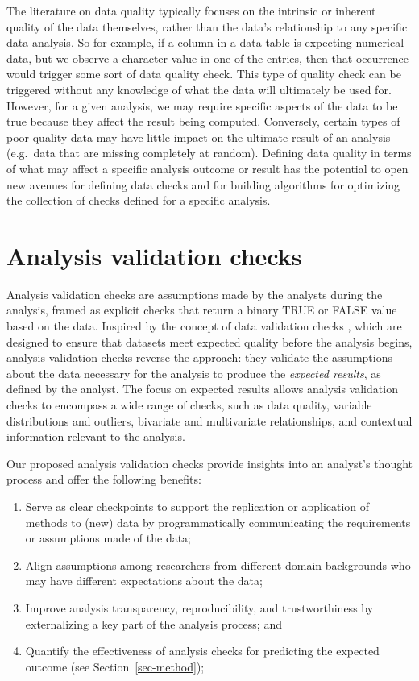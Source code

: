 \documentclass[
  12pt,
]{interact}
\providecommand{\tightlist}{%
  \setlength{\itemsep}{0pt}\setlength{\parskip}{0pt}}
\begin{document}
The literature on data quality typically focuses on the intrinsic or
inherent quality of the data themselves, rather than the data's
relationship to any specific data analysis. So for example, if a column
in a data table is expecting numerical data, but we observe a character
value in one of the entries, then that occurrence would trigger some
sort of data quality check. This type of quality check can be triggered
without any knowledge of what the data will ultimately be used for.
However, for a given analysis, we may require specific aspects of the
data to be true because they affect the result being computed.
Conversely, certain types of poor quality data may have little impact on
the ultimate result of an analysis (e.g.~data that are missing
completely at random). Defining data quality in terms of what may affect
a specific analysis outcome or result has the potential to open new
avenues for defining data checks and for building algorithms for
optimizing the collection of checks defined for a specific analysis.

\section{Analysis validation checks}\label{sec-plan}

Analysis validation checks are assumptions made by the analysts during
the analysis, framed as explicit checks that return a binary TRUE or
FALSE value based on the data. Inspired by the concept of data
validation checks \citep{validate}, which are designed to ensure that
datasets meet expected quality before the analysis begins, analysis
validation checks reverse the approach: they validate the assumptions
about the data necessary for the analysis to produce the \emph{expected
results}, as defined by the analyst. The focus on expected results
allows analysis validation checks to encompass a wide range of checks,
such as data quality, variable distributions and outliers, bivariate and
multivariate relationships, and contextual information relevant to the
analysis.

Our proposed analysis validation checks provide insights into an
analyst's thought process and offer the following benefits:

\begin{enumerate}
\def\labelenumi{\arabic{enumi}.}
\tightlist
\item
  Serve as clear checkpoints to support the replication or application
  of methods to (new) data by programmatically communicating the
  requirements or assumptions made of the data;
\item
  Align assumptions among researchers from different domain backgrounds
  who may have different expectations about the data;
\item
  Improve analysis transparency, reproducibility, and trustworthiness by
  externalizing a key part of the analysis process; and
\item
  Quantify the effectiveness of analysis checks for predicting the
  expected outcome (see Section~\ref{sec-method});
\end{enumerate}
\end{document}
